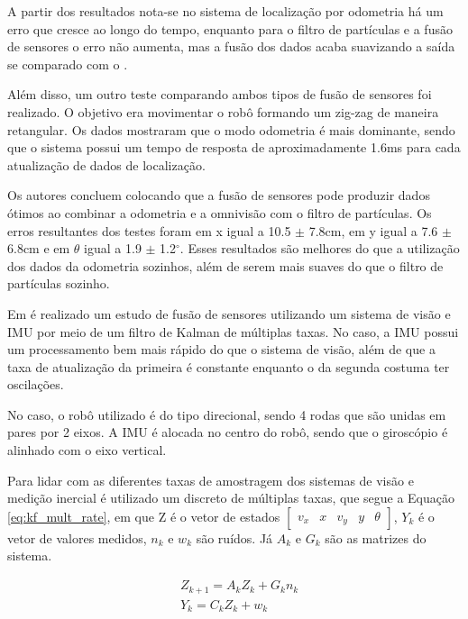 \documentclass[acronym, symbols, table]{fei}
\begin{document}
	A partir dos resultados nota-se no sistema de localização por odometria há um erro que cresce ao longo do tempo, enquanto para o filtro de partículas e a fusão de sensores o erro não aumenta, mas a fusão dos dados acaba suavizando a saída se comparado com o .
	
	Além disso, um outro teste comparando ambos tipos de fusão de sensores foi realizado. O objetivo era movimentar o robô formando um zig-zag de maneira retangular. Os dados mostraram que o modo odometria é mais dominante, sendo que o sistema possui um tempo de resposta de aproximadamente 1.6ms para cada atualização de dados de localização.
	
	Os autores concluem colocando que a fusão de sensores pode produzir dados ótimos ao combinar a odometria e a omnivisão com o filtro de partículas. Os erros resultantes dos testes foram em x igual a 10.5 $\pm$ 7.8cm, em y igual a 7.6 $\pm$ 6.8cm e em $\theta$ igual a 1.9 $\pm$ 1.2$^\circ$. Esses resultados são melhores do que a utilização dos dados da odometria sozinhos, além de serem mais suaves do que o filtro de partículas sozinho.
	
	Em \textcite{10.1007/978-3-642-54734-8_23} é realizado um estudo de fusão de sensores utilizando um sistema de visão e IMU por meio de um filtro de Kalman de múltiplas taxas. No caso, a IMU possui um processamento bem mais rápido do que o sistema de visão, além de que a taxa de atualização da primeira é constante enquanto o da segunda costuma ter oscilações.
	
	No caso, o robô utilizado é do tipo direcional, sendo 4 rodas que são unidas em pares por 2 eixos. A IMU é alocada no centro do robô, sendo que o giroscópio é alinhado com o eixo vertical.
	
	Para lidar com as diferentes taxas de amostragem dos sistemas de visão e medição inercial é utilizado um  discreto de múltiplas taxas, que segue a Equação \ref{eq:kf_mult_rate}, em que Z é o vetor de estados $\begin{bmatrix} v_x & x & v_y & y & \theta \end{bmatrix}$, $Y_k$ é o vetor de valores medidos, $n_k$ e $w_k$ são ruídos. Já $A_k$ e $G_k$ são as matrizes do sistema.
	
	\begin{equation}\label{eq:kf_mult_rate}
		\begin{split}
			&Z_{k+1} = A_kZ_k + G_kn_k \\
			&Y_k = C_kZ_k + w_k
		\end{split}
	\end{equation}
	
\end{document}

